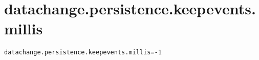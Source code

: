 \section{datachange.persistence.keepevents.millis}
\label{configuration:DatachangePersistenceKeepeventsMillis}
\AvailableInJavaOnly{\TODO}
\begin{lstlisting}[style=Props,caption={Usage example for \textit{datachange.persistence.keepevents.millis}}]
datachange.persistence.keepevents.millis=-1
\end{lstlisting}
